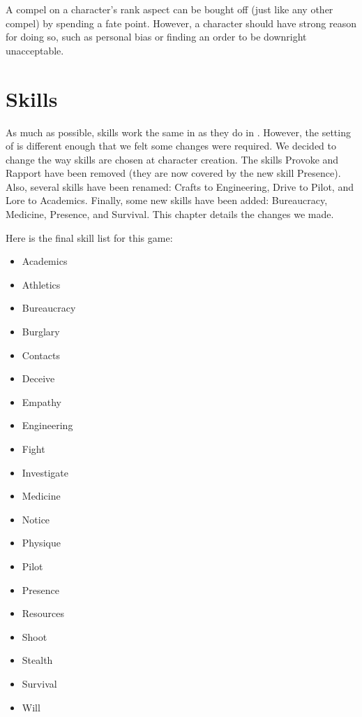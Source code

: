 \documentclass[12pt,titlepage,openany]{book}
\begin{document}
A compel on a character's rank aspect can be bought off (just like any other
compel) by spending a fate point. However, a character should have strong
reason for doing so, such as personal bias or finding an order to be downright
unacceptable.



\chapter{Skills}\label{chap:skills}

As much as possible, skills work the same in \StarTrekFate{} as they do in
\FateCore{}. However, the setting of \StarTrek{} is different enough that we
felt some changes were required. We decided to change the way skills are chosen
at character creation. The skills Provoke and Rapport have been removed (they
are now covered by the new skill Presence). Also, several skills have been
renamed: Crafts to Engineering, Drive to Pilot, and Lore to Academics. Finally,
some new skills have been added: Bureaucracy, Medicine, Presence, and Survival.
This chapter details the changes we made.

Here is the final skill list for this game:

\begin{multicols}{3}
    \raggedcolumns
    \begin{itemize}
        \item Academics
        \item Athletics
        \item Bureaucracy
        \item Burglary
        \item Contacts
        \item Deceive
        \item Empathy
        \item Engineering
        \item Fight
        \item Investigate
        \item Medicine
        \item Notice
        \item Physique
        \item Pilot
        \item Presence
        \item Resources
        \item Shoot
        \item Stealth
        \item Survival
        \item Will
    \end{itemize}
\end{multicols}
\end{document}
